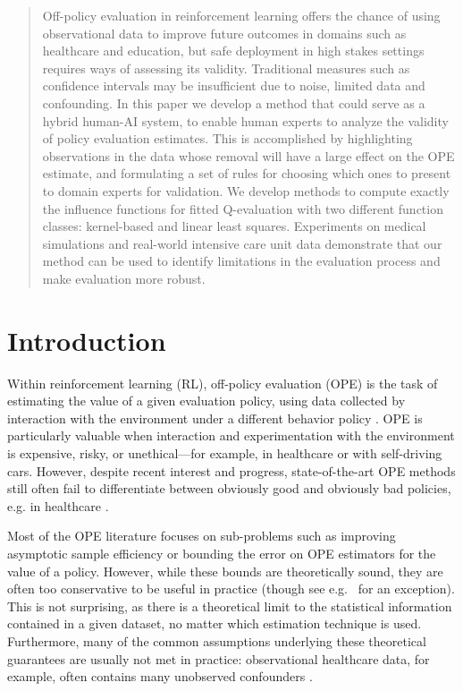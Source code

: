 \documentclass{article}
\begin{document}

\begin{abstract}
    Off-policy evaluation in reinforcement learning offers the chance of using observational data to improve future outcomes in domains such as healthcare and education, but safe deployment in high stakes settings requires ways of assessing its validity. Traditional measures such as confidence intervals may be insufficient due to noise, limited data and confounding. In this paper we develop a method that could serve as a hybrid human-AI system, to enable human experts to analyze the validity of policy evaluation estimates. This is accomplished by highlighting observations in the data whose removal will have a large effect on the OPE estimate, and formulating a set of rules for choosing which ones to present to domain experts for validation. We develop methods to compute exactly the influence functions for fitted Q-evaluation with two different function classes: kernel-based and linear least squares. Experiments on medical simulations and real-world intensive care unit data demonstrate that our method can be used to identify limitations in the evaluation process and make evaluation more robust.
\end{abstract}

\section{Introduction}

Within reinforcement learning (RL), off-policy evaluation (OPE) is the task of estimating the value of a given evaluation policy, using data collected by interaction with the environment under a different behavior policy \citep{sutton2018reinforcement, precup2000eligibility}. OPE is particularly valuable when interaction and experimentation with the environment is expensive, risky, or unethical---for example, in healthcare or with self-driving cars. However, despite recent interest and progress, state-of-the-art OPE methods still often fail to differentiate between obviously good and obviously bad policies, e.g. in healthcare \citep{gottesman2018evaluating}.

Most of the OPE literature focuses on sub-problems such as improving asymptotic sample efficiency or bounding the error on OPE estimators for the value of a policy. However, while these bounds are theoretically sound, they are often too conservative to be useful in practice (though see e.g.~\citet{thomas2019} for an exception). This is not surprising, as there is a theoretical limit to the statistical information contained in a given dataset, no matter which estimation technique is used. Furthermore, many of the common assumptions underlying these theoretical guarantees are usually not met in practice: observational healthcare data, for example, often contains many unobserved confounders \citep{gottesman2019guidelines}.
\end{document}
